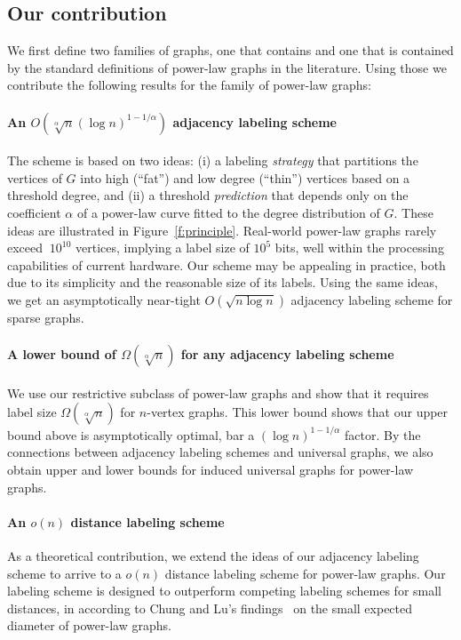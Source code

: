 \subsection{Our contribution}
We first define two families of graphs, one that  contains and one that is contained by the standard definitions of power-law graphs in the literature.
Using those we contribute the following results for the family of power-law graphs:

\paragraph{An  $O(\sqrt[\alpha] n (\log n)^{1 - 1/\alpha})$ adjacency labeling scheme}
The scheme is based on two ideas:
(i) a labeling \emph{strategy} that  partitions the vertices of $G$ into high (``fat'') and low degree (``thin'') vertices based on a threshold degree, and (ii) a threshold \emph{prediction} that depends only on the coefficient $\alpha$ of a power-law curve fitted to the degree distribution of $G$. These ideas are illustrated in Figure~\ref{f:principle}.
Real-world power-law graphs rarely exceed  $~10^{10}$ vertices, implying a label size of  ${10^{5}}$ bits, well within the processing capabilities of current hardware. 
Our  scheme may be appealing in practice,  both due  to its simplicity and the reasonable size of its labels.
Using the same ideas, we get an  asymptotically near-tight  $O(\sqrt{n \log n})$ adjacency labeling scheme for sparse graphs.
\vspace{-0.6cm}
\paragraph{A lower bound of $\Omega(\sqrt[\alpha]{n})$ for any adjacency labeling scheme}
We use our  restrictive subclass of power-law graphs and  show that it requires label size $\Omega(\sqrt[\alpha]{n})$ for $n$-vertex graphs.
This lower bound shows that our upper bound above is asymptotically  optimal, bar a $(\log n)^{1 - 1/\alpha}$ factor.
By the connections between adjacency labeling schemes and universal graphs, we also obtain upper and lower bounds for induced universal graphs for power-law graphs. 

\vspace{-0.6cm}
\paragraph{An $o(n)$ distance labeling scheme}
As a theoretical contribution, we extend the ideas of our  adjacency labeling scheme to arrive to a $o(n)$ distance labeling scheme for power-law graphs.
Our labeling scheme is designed to outperform competing labeling schemes for small distances, in according to Chung and Lu's findings~\cite{chung2004average} on the small expected diameter of power-law graphs.

